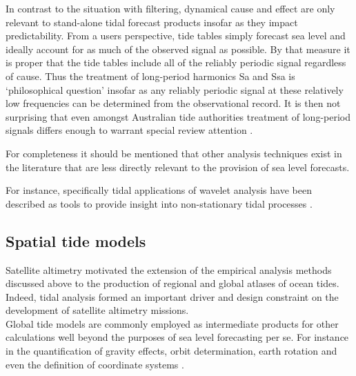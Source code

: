 In contrast to the situation with filtering, dynamical cause and effect are only relevant to stand-alone tidal forecast products insofar as they impact predictability.  From a users perspective, tide tables simply forecast sea level and ideally account for as much of the observed signal as possible.   By that measure it is proper that the tide tables include all of the reliably periodic signal regardless of cause.   
Thus the treatment of long-period harmonics Sa and Ssa is `philosophical question' \citep{Parker:2007wq} insofar as any reliably periodic signal at these relatively low frequencies can be determined from the observational record.  It is then not surprising that even amongst Australian tide authorities treatment of long-period signals differs enough to warrant special review attention \citep{MHL2156}.

For completeness it should be mentioned that other analysis techniques exist in the literature that are less directly relevant to the provision of sea level forecasts.


For instance, specifically tidal applications of wavelet analysis have been described as tools to provide insight into non-stationary tidal processes \citep{Flinchem:2000kp}.



\subsection{Spatial tide models}

Satellite altimetry motivated the extension of the empirical analysis methods discussed above to the production of regional and global atlases of ocean tides.  Indeed, tidal analysis formed an important driver and design constraint on the development of satellite altimetry missions.\\
Global tide models are commonly employed as intermediate products for other calculations well beyond the purposes of sea level forecasting per se.  For instance in the quantification of gravity effects, orbit determination, earth rotation and even the definition of coordinate systems \citep{Anonymous:2004tm}.\\



